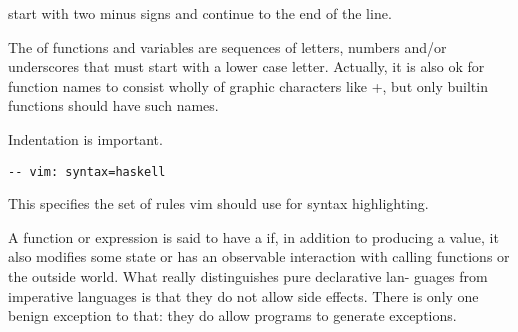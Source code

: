  start with two minus signs and continue
to the end of the line.

The  of functions and variables are sequences
of letters, numbers and/or underscores that must
start with a lower case letter. Actually, it is also ok for function names to
consist wholly of graphic characters like +, but only
builtin functions should have such names.

Indentation is important.


\begin{lstlisting}
-- vim: syntax=haskell
\end{lstlisting}
This specifies the
set of rules vim should use for syntax highlighting.


A function or expression is said to have a 
if, in addition to producing a value, it also modifies
some state or has an observable interaction with
calling functions or the outside world. 
What really distinguishes pure declarative lan-
guages from imperative languages is that they do
not allow side effects.
There is only one benign exception to that: they
do allow programs to generate exceptions.

